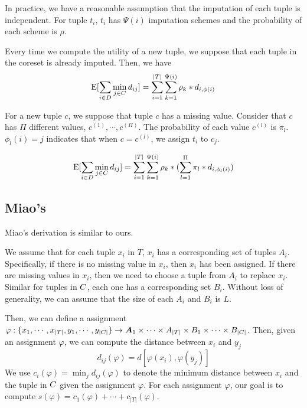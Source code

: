 In practice, we have a reasonable assumption that the imputation of each tuple is independent. For tuple $t_i$, $t_i$ has $\Psi(i)$ imputation schemes and the probability of each scheme is $\rho$.

Every time we compute the utility of a new tuple, we suppose that each tuple in the coreset is already imputed. Then, we have
\begin{equation}
	\begin{aligned}
	\mathrm{E}[\sum_{i\in D} \min_{j\in C} d_{ij}] = \sum_{i=1}^{|T|} \sum_{k=1}^{\Psi(i)} \rho_{k} * d_{i, \phi(i)} 
	\end{aligned}
\end{equation}

 
For a new tuple $c$, we suppose that tuple $c$ has a missing value. Consider that $c$ has $\Pi$ different values, \ie $c^{(1)}, \cdots, c^{(\Pi)}$. The probability of each value $c^{(l)}$ is $\pi_{l}$. $\phi_{l}(i)=j$ indicates that when  $c = c^{(l)}$, we assign  $t_i$ to $c_j$.

\begin{equation}
	\mathrm{E}[\sum_{i\in D} \min_{j\in C} d_{ij}]  = \sum_{i=1}^{|T|} \sum_{k=1}^{\Psi(i)} \rho_{k} * (\sum_{l=1}^{\Pi} \pi_{l} * d_{i, \phi_{l}(i)}) 
\end{equation}

\subsection{Miao's}

Miao's derivation is similar to ours. 

We assume that for each tuple $x_i$ in $T$, $x_i$ has a corresponding set of tuples $A_i$. Specifically, if there is no missing value in $x_i$, then $x_i$  has been assigned. If there are missing values in $x_i$, then we need to choose a tuple from $A_i$ to replace $x_i$. Similar for tuples in $C$, each one has a corresponding set $B_i$. Without loss of generality, we can assume that the size of each $A_i$ and $B_i$ is $L$.

Then, we can define a assignment $\varphi: \{x_1, \cdots, x_{|T|}, y_1, \cdots, y_{|C|}\} \rightarrow \bm{A}_1 \times \cdots \times A_{|T|} \times B_1 \times \cdots \times B_{|C|}$. Then, given an assignment $\varphi$, we can compute the distance between $x_i$ and $y_j$ 
\begin{equation}
	d_{ij}(\varphi) = d[\varphi(x_i), \varphi(y_j)]
\end{equation}
We use $c_i(\varphi) = \min_j d_{ij}(\varphi)$ to denote the minimum distance between $x_i$ and the tuple in $C$ given the assignment $\varphi$. For each assignment $\varphi$, our goal is to compute $s(\varphi) = c_1(\varphi) + \cdots + c_{|T|}(\varphi)$. 

